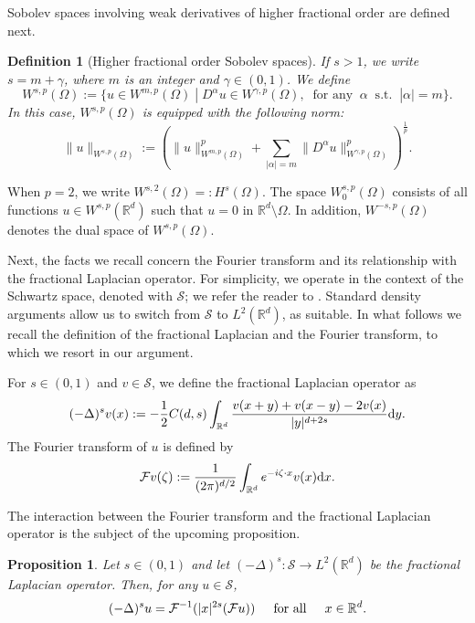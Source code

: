 \documentclass[10pt]{article} %
\newtheorem{Definition}{Definition}
\newtheorem{Proposition}{Proposition}
\begin{document}
Sobolev spaces involving weak derivatives of higher fractional order are defined next.

\begin{Definition}[Higher fractional order Sobolev spaces]\label{def_fracsob2}
If $s > 1$, we write $s= m + \gamma$, where $m$ is an integer and $\gamma \in (0,1)$. We define
\[
W^{s,p}(\Omega) := \{u\in W^{m,p}(\Omega)\;|\;D^\alpha u \in W^{\gamma,p}(\Omega), \;\; \text{for any}\;\;    \alpha   \;\;\text{s.t.}\;\;  |\alpha|=m\}.
\]
In this case, $W^{s,p}(\Omega)$ is equipped with the following norm:
\[
\|u\|_{W^{s,p}(\Omega)} := \left(\|u\|^p_{W^{m,p}(\Omega)}+\sum_{|\alpha|=m}\|D^{\alpha}u\|^p_{W^{\gamma,p}(\Omega)}\right)^{\frac{1}{p}}.
\]
\end{Definition} 

When $p=2$, we write $W^{s,2}(\Omega) =: H^s(\Omega)$. The space $W_0^{s,p}(\Omega)$ consists of all functions $u \in W^{s,p}(\mathbb{R}^d)$ such that $u = 0$ in $\mathbb{R}^d\setminus \Omega$. In addition, $W^{-s,p}(\Omega)$ denotes the dual space of $W^{s,p}(\Omega)$.

Next, the facts we recall concern the Fourier transform and its relationship with the fractional Laplacian operator. For simplicity, we operate in the context of the Schwartz space, denoted with $\mathcal{S}$; we refer the reader to \cite[Chapter 3]{Nezza-Palatucci-Valdinoci2012}. Standard density arguments allow us to switch from $\mathcal{S}$ to $L^2(\mathbb{R}^d)$, as suitable. In what follows we recall the definition of the fractional Laplacian and the Fourier transform, to which we resort in our argument.

For $s \in (0,1)$ and $v \in {\mathcal S}$, we define the fractional Laplacian operator as
\[
(-\Delta)^sv(x) := -\frac{1}{2}C(d,s)\int_{\mathbb{R}^d}\frac{v(x+y) + v(x-y) - 2v(x)}{|y|^{d+2s}}{\rm d}y. 
\]
The Fourier transform of $u$ is defined by
\[
	{\mathcal F}v(\zeta) := \frac{1}{(2\pi)^{d/2}}\int_{\mathbb{R}^d}e^{-i\zeta\cdot x}v(x){\rm d}x. 
\]

The interaction between the Fourier transform and the fractional Laplacian operator is the subject of the upcoming proposition.

\begin{Proposition}\label{prop_fourfrac}
Let $s \in (0,1)$ and let $(-\Delta)^s\colon  \mathcal{S} \to L^2(\mathbb{R}^d)$ be the fractional Laplacian operator. Then, for any $u \in {\mathcal S}$,
\[
(-\Delta)^su = {\mathcal F}^{-1}(|x|^{2s}({\mathcal F}u))    \hspace{.2in }\text{for all}\hspace{.2in}   x \in \mathbb{R}^d.
\]
\end{Proposition}
\end{document}
